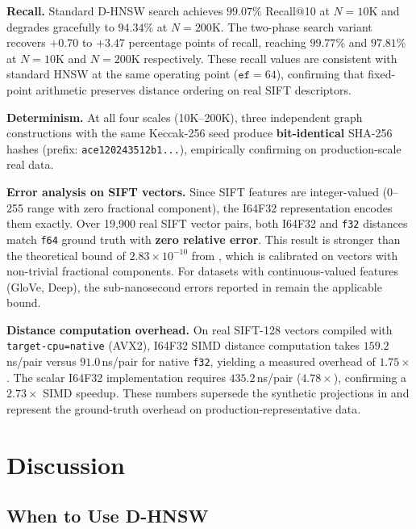 \documentclass[10pt,journal]{IEEEtran}
\newcommand{\dhnsw}{\textsc{D-HNSW}}
\newcommand{\hnsw}{\textsc{HNSW}}
\begin{document}
\textbf{Recall.} Standard \dhnsw{} search achieves $99.07\%$ Recall@10 at $N{=}10$K and degrades gracefully to $94.34\%$ at $N{=}200$K. The two-phase search variant recovers $+0.70$ to $+3.47$ percentage points of recall, reaching $99.77\%$ and $97.81\%$ at $N{=}10$K and $N{=}200$K respectively. These recall values are consistent with standard \hnsw{} at the same operating point ($\texttt{ef}{=}64$), confirming that fixed-point arithmetic preserves distance ordering on real SIFT descriptors.

\textbf{Determinism.} At all four scales (10K--200K), three independent graph constructions with the same Keccak-256 seed produce \textbf{bit-identical} SHA-256 hashes (prefix: \texttt{ace120243512b1...}), empirically confirming  on production-scale real data.

\textbf{Error analysis on SIFT vectors.} Since SIFT features are integer-valued (0--255 range with zero fractional component), the I64F32 representation encodes them exactly. Over 19{,}900 real SIFT vector pairs, both I64F32 and \texttt{f32} distances match \texttt{f64} ground truth with \textbf{zero relative error}. This result is stronger than the theoretical bound of $2.83 \times 10^{-10}$ from , which is calibrated on vectors with non-trivial fractional components. For datasets with continuous-valued features (GloVe, Deep), the sub-nanosecond errors reported in  remain the applicable bound.

\textbf{Distance computation overhead.} On real SIFT-128 vectors compiled with \texttt{target-cpu=native} (AVX2), I64F32 SIMD distance computation takes $159.2$\,ns/pair versus $91.0$\,ns/pair for native \texttt{f32}, yielding a measured overhead of $\mathbf{1.75\times}$. The scalar I64F32 implementation requires $435.2$\,ns/pair ($4.78\times$), confirming a $2.73\times$ SIMD speedup. These numbers supersede the synthetic projections in  and represent the ground-truth overhead on production-representative data.

\section{Discussion}
\label{sec:discussion}

\subsection{When to Use D-HNSW}
\end{document}
